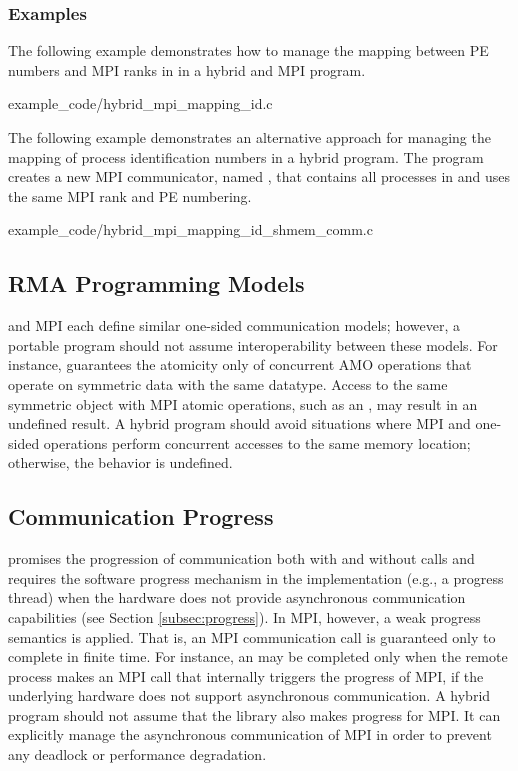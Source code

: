\subsubsection*{Examples}
\label{subsubsec:interoperability:id:example}
The following example demonstrates how to manage the mapping between \openshmem
\ac{PE} numbers and \ac{MPI} ranks in  in a hybrid \openshmem
and \ac{MPI} program.


      {example_code/hybrid_mpi_mapping_id.c}

The following example demonstrates an alternative approach for managing the mapping
of process identification numbers in a hybrid program. The program creates a
new MPI communicator, named , that contains all
processes in  and uses the same \ac{MPI} rank and
\openshmem \ac{PE} numbering.


      {example_code/hybrid_mpi_mapping_id_shmem_comm.c}

\subsection{RMA Programming Models}
\label{subsec:interoperability:rma}

\openshmem and \ac{MPI} each define similar one-sided communication models;
however, a portable program should not assume interoperability between these
models.
For instance, \openshmem guarantees the atomicity only of concurrent \openshmem AMO operations
that operate on symmetric data with the same datatype. Access to the same symmetric
object with \ac{MPI} atomic operations, such as an , may
result in an undefined result. A hybrid program should avoid situations where \ac{MPI} and
\openshmem one-sided operations perform concurrent accesses to the same memory
location; otherwise, the behavior is undefined.

\subsection{Communication Progress}
\label{subsec:interoperability:progress}

\openshmem promises the progression of communication both with and without
\openshmem calls and requires the software progress mechanism in the implementation
(e.g., a progress thread) when the hardware does not provide asynchronous communication
capabilities (see Section \ref{subsec:progress}).
In \ac{MPI}, however, a weak progress semantics is applied. That is,
an \ac{MPI} communication call is guaranteed only to complete in finite time. For
instance, an  may be completed only when the remote process makes an \ac{MPI}
call that internally triggers the progress of \ac{MPI}, if the underlying hardware
does not support asynchronous communication. A hybrid program
should not assume that the \openshmem library also makes progress for \ac{MPI}.
It can explicitly manage the asynchronous communication of \ac{MPI} in
order to prevent any deadlock or performance degradation.
